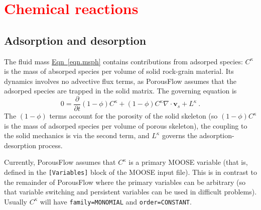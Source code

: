 \documentclass[12pt]{report}
\def\species{\kappa}
\begin{document}
\section{\textcolor{red}{Chemical reactions}}
\label{chem.sec}

\subsection{Adsorption and desorption}
\label{adsorption.sec}

The fluid mass \hyperref[eqn.msph]{Eqn~\ref*{eqn.msph}} contains
contributions from adsorped species: $C^{\species}$ is the mass of
absorped species per volume of solid rock-grain material.  Its
dynamics involves no advective flux terms, as PorousFlow assumes that
the adsorped species are trapped in the solid matrix.  The governing
equation is
\begin{equation}
0 = \frac{\partial}{\partial t}(1 - \phi)C^{\species} + (1 -
\phi)C^{\species}\nabla\cdot{\mathbf{v}}_{s} + L^{\species} \ .
\end{equation}
The $(1-\phi)$ terms account for the porosity of the solid skeleton
(so $(1-\phi)C^{\species}$ is the mass of adsorped species per volume
of porous skeleton), the coupling to the solid mechanics is via the
second term, and $L^{\species}$ governs the adsorption-desorption
process.

Currently, PorousFlow assumes that $C^{\species}$ is a primary MOOSE
variable (that is, defined in the {\tt [Variables]} block of the MOOSE
input file).  This is in contrast to the remainder of PorousFlow where
the primary variables can be arbitrary (so that variable switching and
persistent variables can be used in difficult problems).  Usually
$C^{\species}$ will have {\tt family=MONOMIAL} and {\tt order=CONSTANT}.
\end{document}
